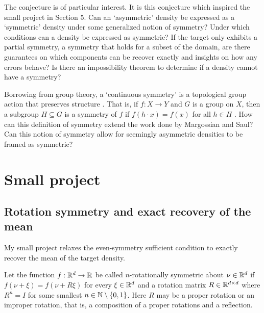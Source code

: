\documentclass{article}
\begin{document}
The conjecture is of particular interest.
It is this conjecture which inspired the small project in Section 5.
Can an `asymmetric' density be expressed as a `symmetric' density under some generalized notion of symmetry?
Under which conditions can a density be expressed as symmetric?
If the target only exhibits a partial symmetry, a symmetry that holds for a subset of the domain,
are there guarantees on which components can be recover exactly and insights on how any errors behave?
Is there an impossibility theorem to determine if a density cannot have a symmetry?

Borrowing from group theory, a `continuous symmetry' is a topological group action that preserves structure \cite{barker2007continuous}.
That is, if $f: X \to Y$ and $G$ is a group on $X$, then a subgroup $H \subseteq G$ is a symmetry of $f$ if $f(h \cdot x) = f(x)$ for all $h \in H$ \cite{barker2007continuous}.
How can this definition of symmetry extend the work done by Margossian and Saul?
Can this notion of symmetry allow for seemingly asymmetric densities to be framed as symmetric?






\section{Small project}


\subsection{Rotation symmetry and exact recovery of the mean}

My small project relaxes the even-symmetry sufficient condition to exactly recover the mean of the target density.

Let the function $f: \mathbb{R}^d \to \mathbb{R}$ be called $n$-rotationally symmetric about $\nu \in \mathbb{R}^d$ if $f(\nu + \xi) = f(\nu + R \xi)$ for every $\xi \in \mathbb{R}^d$ and a rotation matrix $R \in \mathbb{R} ^{d \times d}$ where $R^n = I$ for some smallest $n \in \mathbb{N} \setminus \{0, 1\}$.
Here $R$ may be a proper rotation or an improper rotation, that is, a composition of a proper rotations and a reflection.
\end{document}
